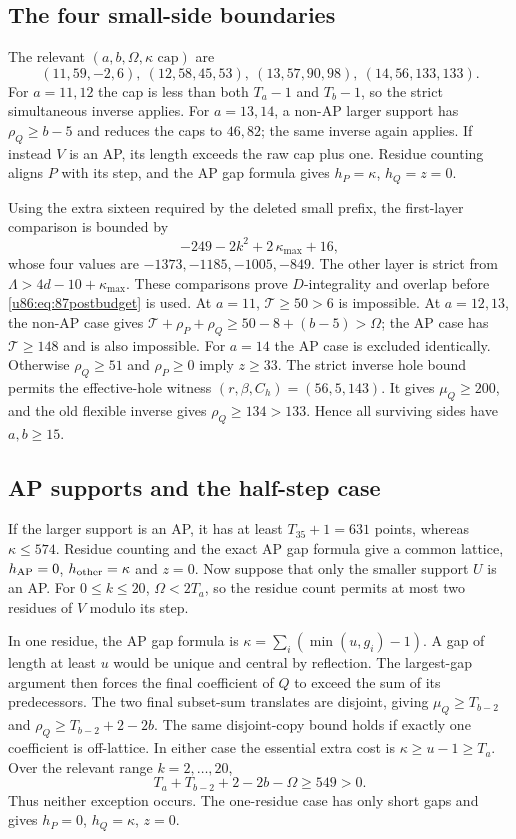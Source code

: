 \documentclass[11pt,a4paper]{article}
\theoremstyle{remark}
\begin{document}
\subsection{The four small-side boundaries}
The relevant $(a,b,\Omega,\kappa\text{ cap})$ are
\[
 (11,59,-2,6),\ (12,58,45,53),\ (13,57,90,98),\ (14,56,133,133).
\]
For $a=11,12$ the cap is less than both $T_a-1$ and $T_b-1$, so the
strict simultaneous inverse applies. For $a=13,14$, a non-AP larger
support has $\rho_Q\ge b-5$ and reduces the caps to $46,82$; the same
inverse again applies. If instead $V$ is an AP, its length exceeds the
raw cap plus one. Residue counting aligns $P$ with its step, and the
AP gap formula gives $h_P=\kappa$, $h_Q=z=0$.

Using the extra sixteen required by the deleted small prefix, the
first-layer comparison is bounded by
\[
 -249-2k^2+2\,\kappa_{\max}+16,
\]
whose four values are $-1373,-1185,-1005,-849$. The other layer is
strict from $\Lambda>4d-10+\kappa_{\max}$. These comparisons prove
$D$-integrality and overlap before \eqref{u86:eq:87postbudget} is used.
At $a=11$, $\mathcal T\ge50>6$ is impossible. At $a=12,13$, the
non-AP case gives $\mathcal T+\rho_P+\rho_Q\ge50-8+(b-5)>\Omega$;
the AP case has $\mathcal T\ge148$ and is also impossible.
For $a=14$ the AP case is excluded identically. Otherwise
$\rho_Q\ge51$ and $\rho_P\ge0$ imply $z\ge33$. The strict inverse
hole bound permits the effective-hole witness $(r,\beta,C_h)=(56,5,143)$.
It gives $\mu_Q\ge200$, and the old flexible inverse gives
$\rho_Q\ge134>133$. Hence all surviving sides have $a,b\ge15$.

\subsection{AP supports and the half-step case}
If the larger support is an AP, it has at least $T_{35}+1=631$ points,
whereas $\kappa\le574$. Residue counting and the exact AP gap formula
give a common lattice, $h_{\rm AP}=0$, $h_{\rm other}=\kappa$ and $z=0$.
Now suppose that only the smaller support $U$ is an AP. For
$0\le k\le20$, $\Omega<2T_a$, so the residue count permits at most
two residues of $V$ modulo its step.

In one residue, the AP gap formula is
$\kappa=\sum_i(\min(u,g_i)-1)$. A gap of length at least $u$ would be
unique and central by reflection. The largest-gap argument then forces
the final coefficient of $Q$ to exceed the sum of its predecessors.
The two final subset-sum translates are disjoint, giving
$\mu_Q\ge T_{b-2}$ and $\rho_Q\ge T_{b-2}+2-2b$.
The same disjoint-copy bound holds if exactly one coefficient is
off-lattice. In either case the essential extra cost is
$\kappa\ge u-1\ge T_a$. Over the relevant range $k=2,\ldots,20$,
\[
 T_a+T_{b-2}+2-2b-\Omega\ge549>0.
\]
Thus neither exception occurs. The one-residue case has only short
gaps and gives $h_P=0$, $h_Q=\kappa$, $z=0$.
\end{document}
